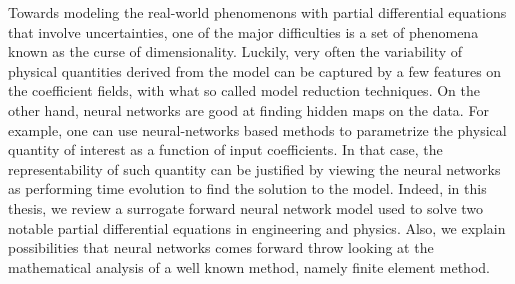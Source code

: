 % 
% 
%
Towards modeling the real-world phenomenons with partial differential equations that involve uncertainties, one of the major difficulties is a set of phenomena known as the curse of dimensionality. Luckily, very often the variability of physical quantities derived from the model can be captured by a few features on the coefficient fields, with what so called model reduction techniques. On the other hand, neural networks are good at finding hidden maps on the data. For example, one can use neural-networks based methods to parametrize the physical quantity of interest as a function of input coefficients. In that case, the representability of such quantity can be justified by viewing the neural networks as performing time evolution to find the solution to the model. Indeed, in this thesis, we review a surrogate forward neural network model used to solve two notable partial differential equations in engineering and physics. Also, we explain possibilities that neural networks comes forward throw looking at the mathematical analysis of a well known method, namely finite element method.

